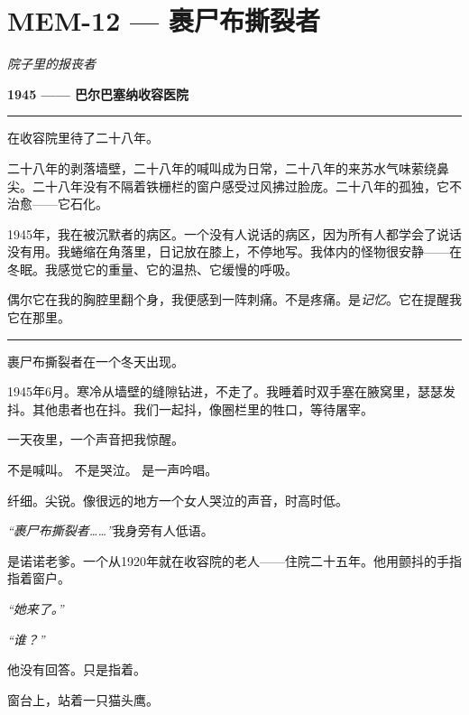 \section*{\textbf{MEM-12} --- 裹尸布撕裂者}

\noindent \textit{院子里的报丧者}

\noindent \textbf{1945 —— 巴尔巴塞纳收容医院}

\vspace{0.5em}\noindent\rule{\textwidth}{0.5pt}\vspace{0.5em}

\noindent 在收容院里待了二十八年。

\noindent 二十八年的剥落墙壁，二十八年的喊叫成为日常，二十八年的来苏水气味萦绕鼻尖。二十八年没有不隔着铁栅栏的窗户感受过风拂过脸庞。二十八年的孤独，它不治愈——它石化。

\noindent 1945年，我在被沉默者的病区。一个没有人说话的病区，因为所有人都学会了说话没有用。我蜷缩在角落里，日记放在膝上，不停地写。我体内的怪物很安静——在冬眠。我感觉它的重量、它的温热、它缓慢的呼吸。

\noindent 偶尔它在我的胸腔里翻个身，我便感到一阵刺痛。不是疼痛。是\textit{记忆}。它在提醒我它在那里。

\vspace{0.5em}\noindent\rule{\textwidth}{0.5pt}\vspace{0.5em}

\noindent 裹尸布撕裂者在一个冬天出现。

\noindent 1945年6月。寒冷从墙壁的缝隙钻进，不走了。我睡着时双手塞在腋窝里，瑟瑟发抖。其他患者也在抖。我们一起抖，像圈栏里的牲口，等待屠宰。

\noindent 一天夜里，一个声音把我惊醒。

\noindent 不是喊叫。
不是哭泣。
是一声吟唱。

\noindent 纤细。尖锐。像很远的地方一个女人哭泣的声音，时高时低。

\noindent \textit{“裹尸布撕裂者……”}我身旁有人低语。

\noindent 是诺诺老爹。一个从1920年就在收容院的老人——住院二十五年。他用颤抖的手指指着窗户。

\noindent \textit{“她来了。”}

\noindent \textit{“谁？”}

\noindent 他没有回答。只是指着。

\noindent 窗台上，站着一只猫头鹰。

